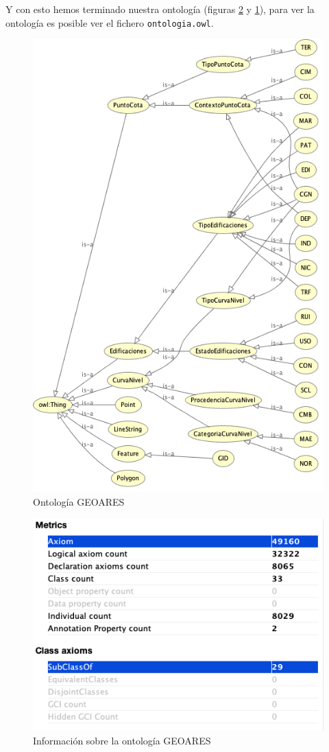 Y con esto hemos terminado nuestra ontología (figuras \ref{fig:info-ontologia} y \ref{fig:ontologia-final}), para ver la ontología es posible ver el fichero \texttt{ontologia.owl}.



\begin{figure}[H]
	\centering
	\includegraphics[width=0.7\linewidth]{imagenes/capitulo5/ontologia-final}
	\caption{Ontología GEOARES}
	\label{fig:ontologia-final}
\end{figure}

\begin{figure}[H]
	\centering
	\includegraphics[width=0.6\linewidth]{imagenes/capitulo5/info-ontologia}
	\caption{Información sobre la ontología GEOARES}
	\label{fig:info-ontologia}
\end{figure}

